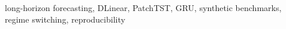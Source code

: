 long-horizon forecasting, DLinear, PatchTST, GRU, synthetic benchmarks, regime switching, reproducibility
